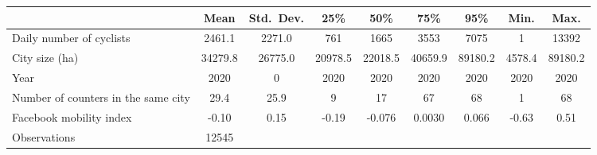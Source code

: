 {
\def\sym#1{\ifmmode^{#1}\else\(^{#1}\)\fi}
\begin{tabular}{l*{1}{cccccccc}}
\toprule
                    &        Mean&  Std.\ Dev.&        25\%&        50\%&        75\%&        95\%&        Min.&        Max.\\
\midrule
Daily number of cyclists&      2461.1&      2271.0&         761&        1665&        3553&        7075&           1&       13392\\
City size (ha)      &     34279.8&     26775.0&     20978.5&     22018.5&     40659.9&     89180.2&      4578.4&     89180.2\\
Year                &        2020&           0&        2020&        2020&        2020&        2020&        2020&        2020\\
Number of counters in the same city&        29.4&        25.9&           9&          17&          67&          68&           1&          68\\
Facebook mobility index&       -0.10&        0.15&       -0.19&      -0.076&      0.0030&       0.066&       -0.63&        0.51\\
\midrule
Observations        &       12545&            &            &            &            &            &            &            \\
\bottomrule
\end{tabular}
}
